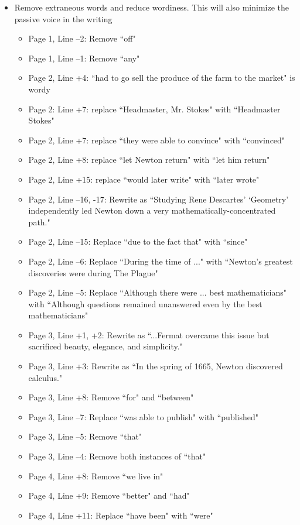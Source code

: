 \documentclass[11pt]{article}
\begin{document}
\begin{itemize}
	\item Remove extraneous words and reduce wordiness. This will also minimize the passive voice in the writing
	\begin{itemize}
		\item Page 1, Line --2: Remove ``off"
		\item Page 1, Line --1: Remove ``any"
		\item Page 2, Line +4: ``had to go sell the produce of the farm to the market" is wordy
		\item Page 2: Line +7: replace ``Headmaster, Mr. Stokes" with ``Headmaster Stokes"
		\item Page 2, Line +7: replace ``they were able to convince" with ``convinced"
		\item Page 2, Line +8: replace ``let Newton return" with ``let him return"
		\item Page 2, Line +15: replace ``would later write" with ``later wrote"
		\item Page 2, Line --16, -17: Rewrite as ``Studying Rene Descartes' `Geometry' independently led Newton down a very mathematically-concentrated path."
		\item Page 2, Line --15: Replace ``due to the fact that" with ``since"
		\item Page 2, Line --6: Replace ``During the time of ..." with ``Newton's greatest discoveries were during The Plague"
		\item Page 2, Line --5: Replace ``Although there were ... best mathematicians" with ``Although questions remained unanswered even by the best mathematicians"
		\item Page 3, Line +1, +2: Rewrite as ``...Fermat overcame this issue but sacrificed beauty, elegance, and simplicity."
		\item Page 3, Line +3: Rewrite as ``In the spring of 1665, Newton discovered calculus."
		\item Page 3, Line +8: Remove ``for" and ``between"
		\item Page 3, Line --7: Replace ``was able to publish" with ``published"
		\item Page 3, Line --5: Remove ``that"
		\item Page 3, Line --4: Remove both instances of ``that"
		\item Page 4, Line +8: Remove ``we live in"
		\item Page 4, Line +9: Remove ``better" and ``had"
		\item Page 4, Line +11: Replace ``have been" with ``were"

\end{itemize}
\end{itemize}
\end{document}
